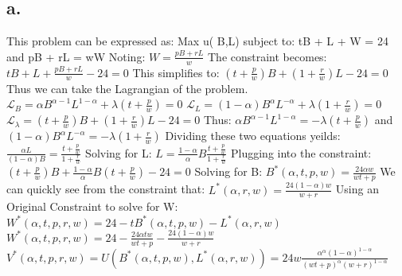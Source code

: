\documentclass[10pt, letterpaper]{paper}
\begin{document}
\subsection*{a.}
This problem can be expressed as: Max u( B,L) subject to: tB + L + W = 24 and pB + rL = wW
\newline
Noting: $W = \frac{ pB + rL }{w}$ The constraint becomes: $tB + L + \frac{ pB + rL }{w} - 24 = 0$
\newline
This simplifies to: $(t + \frac{p}{w} )B + ( 1 + \frac{r}{w} )L - 24 = 0$
\newline
Thus we can take the Lagrangian of the problem.
\newline
$\mathscr{L}_B = \alpha B^{\alpha - 1} L^{1-\alpha} + \lambda( t + \frac{p}{w} ) = 0 $
\newline
$\mathscr{L}_L = (1-\alpha) B^{\alpha } L^{-\alpha} + \lambda( 1 + \frac{r}{w} ) = 0 $
\newline
$\mathscr{L}_\lambda = (t + \frac{p}{w} )B + ( 1 + \frac{r}{w} )L - 24 = 0$
\newline
Thus: $\alpha B^{\alpha - 1} L^{1-\alpha} = -\lambda( t + \frac{p}{w} )$ and $(1-\alpha) B^{\alpha } L^{-\alpha} = -\lambda( 1 + \frac{r}{w} )$
\newline
Dividing these two equations yeilds:$ \frac{ \alpha L }{ ( 1 - \alpha ) B } = \frac{ t + \frac{p}{w} }{ 1 + \frac{r}{w}}$
\newline
Solving for L: $L = \frac{ 1 - \alpha }{\alpha} B \frac{ t + \frac{ p }{w} }{ 1 + \frac{ r}{w}}$
\newline
Plugging into the constraint: $(t+\frac{p}{w})B + \frac{ 1-\alpha}{\alpha} B ( t + \frac{p}{w} ) - 24 = 0$
\newline
Solving for B: $B^*( \alpha, t, p, w ) = \frac{ 24 \alpha w }{ wt + p }$
\newline
We can quickly see from the constraint that: $L^*( \alpha, r, w ) = \frac{ 24 ( 1 - \alpha ) w }{w + r}$
\newline\quad
\newline
Using an Original Constraint to solve for W:
\newline
$W^*(\alpha, t, p, r, w ) = 24 - tB^*( \alpha, t, p, w ) - L^*( \alpha, r, w )$
\newline
$W^*(\alpha, t, p, r, w ) = 24 - \frac{ 24 \alpha t w }{  wt + p} - \frac{ 24 (1 - \alpha ) w }{ w + r }$
\newline\quad
\newline
$V^*(\alpha, t, p, r, w ) = U( B^*( \alpha, t, p, w ), L^*( \alpha, r, w ) ) = 24w \frac{ \alpha^\alpha (1-\alpha)^{1-\alpha}  }{ (wt + p)^\alpha ( w + r )^{1-\alpha} }$
\end{document}
